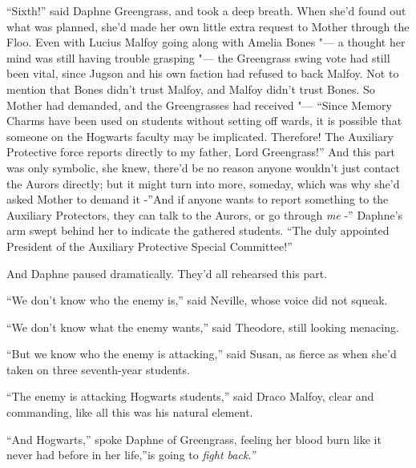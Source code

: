 ``Sixth!'' said Daphne Greengrass, and took a deep breath. When she'd
found out what was planned, she'd made her own little extra request to
Mother through the Floo. Even with Lucius Malfoy going along with Amelia
Bones "--- a thought her mind was still having trouble grasping "--- the
Greengrass swing vote had still been vital, since Jugson and his own
faction had refused to back Malfoy. Not to mention that Bones didn't
trust Malfoy, and Malfoy didn't trust Bones. So Mother had demanded, and
the Greengrasses had received "--- ``Since Memory Charms have been used on
students without setting off wards, it is possible that someone on the
Hogwarts faculty may be implicated. Therefore! The Auxiliary Protective
force reports directly to my father, Lord Greengrass!'' And this part
was only symbolic, she knew, there'd be no reason anyone wouldn't just
contact the Aurors directly; but it might turn into more, someday, which
was why she'd asked Mother to demand it -''And if anyone wants to report
something to the Auxiliary Protectors, they can talk to the Aurors, or
go through \emph{me} -'' Daphne's arm swept behind her to indicate the
gathered students. ``The duly appointed President of the Auxiliary
Protective Special Committee!''

And Daphne paused dramatically. They'd all rehearsed this part.

``We don't know who the enemy is,'' said Neville, whose voice did not
squeak.

``We don't know what the enemy wants,'' said Theodore, still looking
menacing.

``But we know who the enemy is attacking,'' said Susan, as fierce as
when she'd taken on three seventh-year students.

``The enemy is attacking Hogwarts students,'' said Draco Malfoy, clear
and commanding, like all this was his natural element.

``And Hogwarts,'' spoke Daphne of Greengrass, feeling her blood burn
like it never had before in her life,''is going to \emph{fight back.''}
